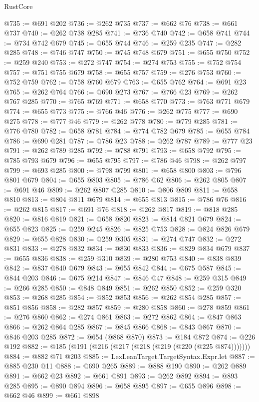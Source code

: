\begin{lexlean}{RustCore}
\begin{coremodule}
@735 := @691 @202
@736 := @262 @735
@737 := @662 @76
@738 := @661 @737
@740 := @262 @738 @285
@741 := @736 @740
@742 := @658 @741
@744 := @734 @742 @679
@745 := @655 @744
@746 := @259 @235
@747 := @282 @285
@748 := @746 @747
@750 := @745 @748 @679
@751 := @655 @750
@752 := @259 @240
@753 := @272 @747
@754 := @274 @753
@755 := @752 @754
@757 := @751 @755 @679
@758 := @655 @757
@759 := @276 @753
@760 := @752 @759
@762 := @758 @760 @679
@763 := @655 @762
@764 := @691 @23
@765 := @262 @764
@766 := @690 @273
@767 := @766 @23
@769 := @262 @767 @285
@770 := @765 @769
@771 := @658 @770
@773 := @763 @771 @679
@774 := @655 @773
@775 := @766 @46
@776 := @262 @775
@777 := @690 @275
@778 := @777 @46
@779 := @262 @778
@780 := @779 @285
@781 := @776 @780
@782 := @658 @781
@784 := @774 @782 @679
@785 := @655 @784
@786 := @690 @281
@787 := @786 @23
@788 := @262 @787
@789 := @777 @23
@791 := @262 @789 @285
@792 := @788 @791
@793 := @658 @792
@795 := @785 @793 @679
@796 := @655 @795
@797 := @786 @46
@798 := @262 @797
@799 := @693 @285
@800 := @798 @799
@801 := @658 @800
@803 := @796 @801 @679
@804 := @655 @803
@805 := @786 @62
@806 := @262 @805
@807 := @691 @46
@809 := @262 @807 @285
@810 := @806 @809
@811 := @658 @810
@813 := @804 @811 @679
@814 := @655 @813
@815 := @786 @76
@816 := @262 @815
@817 := @691 @76
@818 := @262 @817
@819 := @818 @285
@820 := @816 @819
@821 := @658 @820
@823 := @814 @821 @679
@824 := @655 @823
@825 := @259 @245
@826 := @825 @753
@828 := @824 @826 @679
@829 := @655 @828
@830 := @259 @305
@831 := @274 @747
@832 := @272 @831
@833 := @278 @832
@834 := @830 @833
@836 := @829 @834 @679
@837 := @655 @836
@838 := @259 @310
@839 := @280 @753
@840 := @838 @839
@842 := @837 @840 @679
@843 := @655 @842
@844 := @675 @587
@845 := @844 @203
@846 := @675 @214
@847 := @846 @47
@848 := @259 @315
@849 := @266 @285
@850 := @848 @849
@851 := @262 @850
@852 := @259 @320
@853 := @268 @285
@854 := @852 @853
@856 := @262 @854 @285
@857 := @851 @856
@858 := @282 @857
@859 := @280 @858
@860 := @278 @859
@861 := @276 @860
@862 := @274 @861
@863 := @272 @862
@864 := @847 @863
@866 := @262 @864 @285
@867 := @845 @866
@868 := @843 @867
@870 := @846 @203 @285
@872 := @654 (@868 @870)
@873 := @184 @872
@874 := @226 @192
@882 := @185 (@191 (@216 (@217 (@218 (@219 (@220 (@225 @874)))))))
@884 := @882 @71 @203
@885 := LexLeanTarget.TargetSyntax.Expr.let
@887 := @885 @230 @11
@888 := @690 @265
@889 := @888 @190
@890 := @262 @889
@891 := @662 @23
@892 := @661 @891
@893 := @262 @892
@894 := @893 @285
@895 := @890 @894
@896 := @658 @895
@897 := @655 @896
@898 := @662 @46
@899 := @661 @898

\end{coremodule}
\end{lexlean}
